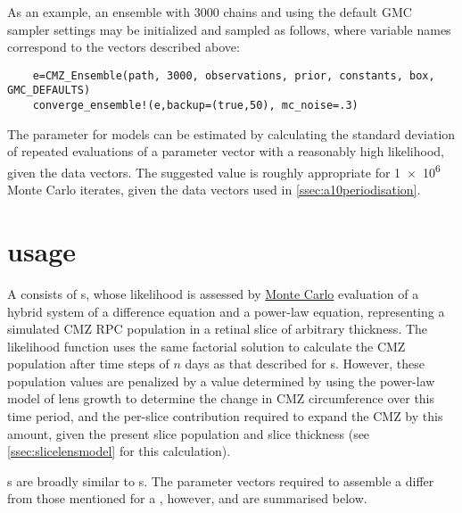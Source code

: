 As an example, an ensemble with 3000 chains and using the default GMC sampler settings may be initialized and sampled as follows, where variable names correspond to the vectors described above:

\begin{verbatim}
    e=CMZ_Ensemble(path, 3000, observations, prior, constants, box, GMC_DEFAULTS)
    converge_ensemble!(e,backup=(true,50), mc_noise=.3)
\end{verbatim}

The  parameter for  models can be estimated by calculating the standard deviation of repeated evaluations of a parameter vector with a reasonably high likelihood, given the data vectors. The suggested value is roughly appropriate for \num{1e6} Monte Carlo iterates, given the data vectors used in \autoref{ssec:a10periodisation}.

\section{\protect{} usage}
A  consists of s, whose likelihood is assessed by \hyperref[MonteCarlo]{Monte Carlo} evaluation of a hybrid system of a difference equation and a power-law equation, representing a simulated CMZ RPC population in a retinal slice of arbitrary thickness. The  likelihood function uses the same factorial solution to calculate the CMZ population after time steps of $n$ days as that described for s. However, these population values are penalized by a value determined by using the power-law model of lens growth to determine the change in CMZ circumference over this time period, and the per-slice contribution required to expand the CMZ by this amount, given the present slice population and slice thickness (see \autoref{ssec:slicelensmodel} for this calculation).

s are broadly similar to s. The parameter vectors required to assemble a  differ from those mentioned for a , however, and are summarised below. 

